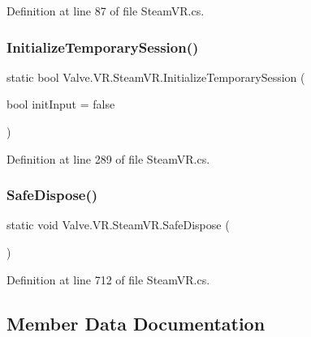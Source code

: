 Definition at line 87 of file Steam\+V\+R.\+cs.

\mbox{\label{class_valve_1_1_v_r_1_1_steam_v_r_af84660d96abb07e1e6d776a27568f058}} 
\subsubsection{\texorpdfstring{InitializeTemporarySession()}{InitializeTemporarySession()}}
{\footnotesize\ttfamily static bool Valve.\+V\+R.\+Steam\+V\+R.\+Initialize\+Temporary\+Session (\begin{DoxyParamCaption}\item[{bool}]{init\+Input = {\ttfamily false} }\end{DoxyParamCaption})\hspace{0.3cm}{\ttfamily [static]}}



Definition at line 289 of file Steam\+V\+R.\+cs.

\mbox{\label{class_valve_1_1_v_r_1_1_steam_v_r_a05fdc10324d14933a6826c40e1106a10}} 
\subsubsection{\texorpdfstring{SafeDispose()}{SafeDispose()}}
{\footnotesize\ttfamily static void Valve.\+V\+R.\+Steam\+V\+R.\+Safe\+Dispose (\begin{DoxyParamCaption}{ }\end{DoxyParamCaption})\hspace{0.3cm}{\ttfamily [static]}}



Definition at line 712 of file Steam\+V\+R.\+cs.



\subsection{Member Data Documentation}
\mbox{\label{class_valve_1_1_v_r_1_1_steam_v_r_a4e095c403f7656c9ccb476658f7b4197}} 
